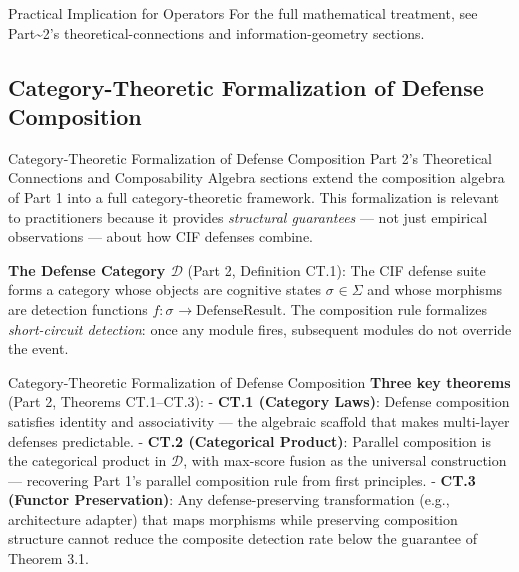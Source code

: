 \documentclass[
  ignorenonframetext,
]{beamer}
\providecommand{\calD}{\mathcal{D}}
\providecommand{\cogstate}[1]{\sigma_{#1}}
\begin{document}
\begin{frame}[allowframebreaks]{Practical Implication for Operators}
For the full mathematical treatment, see Part\textasciitilde2's
theoretical-connections and information-geometry sections.
\end{frame}

\subsection{Category-Theoretic Formalization of Defense
Composition}\label{sec:category-theory-crossref}

\begin{frame}{Category-Theoretic Formalization
of Defense Composition}
Part 2's Theoretical Connections and Composability Algebra sections
extend the composition algebra of Part 1 into a full category-theoretic
framework. This formalization is relevant to practitioners because it
provides \emph{structural guarantees} --- not just empirical
observations --- about how CIF defenses combine.

\textbf{The Defense Category \(\calD\)} (Part 2, Definition CT.1): The
CIF defense suite forms a category whose objects are cognitive states
\(\cogstate{} \in \Sigma\) and whose morphisms are detection functions
\(f : \cogstate{} \to \mathrm{DefenseResult}\). The composition rule
formalizes \emph{short-circuit detection}: once any module fires,
subsequent modules do not override the event.

\end{frame}

\begin{frame}{Category-Theoretic Formalization
of Defense Composition}
\textbf{Three key theorems} (Part 2, Theorems CT.1--CT.3): -
\textbf{CT.1 (Category Laws)}: Defense composition satisfies identity
and associativity --- the algebraic scaffold that makes multi-layer
defenses predictable. - \textbf{CT.2 (Categorical Product)}: Parallel
composition is the categorical product in \(\calD\), with max-score
fusion as the universal construction --- recovering Part 1's parallel
composition rule from first principles. - \textbf{CT.3 (Functor
Preservation)}: Any defense-preserving transformation (e.g.,
architecture adapter) that maps morphisms while preserving composition
structure cannot reduce the composite detection rate below the guarantee
of Theorem 3.1.

\end{frame}
\end{document}
